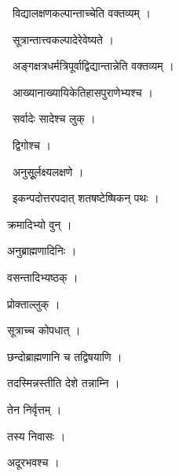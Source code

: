 \documentclass[10pt, openany, oneside]{book}
\begin{document}
\par\noindent\hspace{1.5em}{\vps वा॰}~{\qt विद्यालक्षणकल्पान्ताच्चेति वक्तव्यम् ।}

\par\noindent\hspace{1.5em}{\vps वा॰}~{\qt सूत्रान्तात्त्वकल्पादेरेवेष्यते ।}

\par\noindent\hspace{1.5em}{\vps वा॰}~{\qt अङ्गक्षत्रधर्मत्रिपूर्वाद्विद्यान्तान्नेति वक्तव्यम् ।}

\par\noindent\hspace{1.5em}{\vps वा॰}~{\qt आख्यानाख्यायिकेतिहासपुराणेभ्यश्च ।}

\par\noindent\hspace{1.5em}{\vps वा॰}~{\qt सर्वादेः सादेश्च लुक् ।}

\par\noindent\hspace{1.5em}{\vps वा॰}~{\qt द्विगोश्च ।}

\par\noindent\hspace{1.5em}{\vps वा॰}~{\qt अनुसूूर्लक्ष्यलक्षणे ।}

\par\noindent\hspace{1.5em}{\vps वा॰}~{\qt इकन्पदोत्तरपदात्  शतषष्टेष्षिकन् पथः ।}

\noindent क्रमादिभ्यो वुन् ।

\noindent अनुब्राह्मणादिनिः ।

\noindent वसन्तादिभ्यष्ठक् ।

\noindent प्रोक्ताल्लुक् ।

\noindent सूत्राच्च कोपधात् ।

\noindent छन्दोब्राह्मणानि च तद्विषयाणि ।

\noindent तदस्मिन्नस्तीति देशे तन्नाम्नि ।

\noindent तेन निर्वृत्तम् ।

\noindent तस्य निवासः ।

\noindent अदूरभवश्च ।
\end{document}
